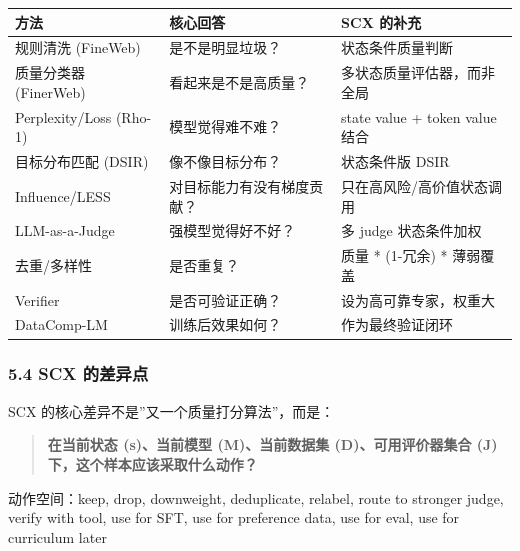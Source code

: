 \documentclass[
  12pt,
]{ctexart}
\begin{document}
\begin{longtable}[]{@{}
  >{\raggedright\arraybackslash}p{}
  >{\raggedright\arraybackslash}p{}
  >{\raggedright\arraybackslash}p{}@{}}
\toprule\noalign{}
\begin{minipage}[b]{\linewidth}\raggedright
方法
\end{minipage} & \begin{minipage}[b]{\linewidth}\raggedright
核心回答
\end{minipage} & \begin{minipage}[b]{\linewidth}\raggedright
SCX 的补充
\end{minipage} \\
\midrule\noalign{}
\endhead
\bottomrule\noalign{}
\endlastfoot
规则清洗 (FineWeb) & 是不是明显垃圾？ & 状态条件质量判断 \\
质量分类器 (FinerWeb) & 看起来是不是高质量？ &
多状态质量评估器，而非全局 \\
Perplexity/Loss (Rho-1) & 模型觉得难不难？ & state value + token value
结合 \\
目标分布匹配 (DSIR) & 像不像目标分布？ & 状态条件版 DSIR \\
Influence/LESS & 对目标能力有没有梯度贡献？ &
只在高风险/高价值状态调用 \\
LLM-as-a-Judge & 强模型觉得好不好？ & 多 judge 状态条件加权 \\
去重/多样性 & 是否重复？ & 质量 * (1-冗余) * 薄弱覆盖 \\
Verifier & 是否可验证正确？ & 设为高可靠专家，权重大 \\
DataComp-LM & 训练后效果如何？ & 作为最终验证闭环 \\
\end{longtable}

\subsubsection{5.4 SCX 的差异点}\label{scx-ux7684ux5deeux5f02ux70b9}

SCX 的核心差异不是''又一个质量打分算法''，而是：

\begin{quote}
\textbf{在当前状态 (s)、当前模型 (M)、当前数据集 (D)、可用评价器集合 (J)
下，这个样本应该采取什么动作？}
\end{quote}

动作空间：keep, drop, downweight, deduplicate, relabel, route to
stronger judge, verify with tool, use for SFT, use for preference data,
use for eval, use for curriculum later
\end{document}
